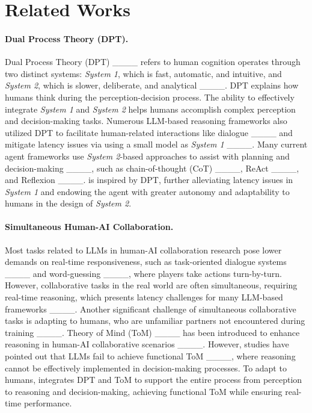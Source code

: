 \section{Related Works}
\paragraph{Dual Process Theory (DPT).}
Dual Process Theory (DPT) ____ refers to human cognition operates through two distinct systems: \textit{System 1}, which is fast, automatic, and intuitive, and \textit{System 2}, which is slower, deliberate, and analytical ____.
DPT explains how humans think during the perception-decision process. 
The ability to effectively integrate \textit{System 1} and \textit{System 2} helps humans accomplish complex perception and decision-making tasks.
Numerous LLM-based reasoning frameworks also utilized DPT to facilitate human-related interactions like dialogue ____ and mitigate latency issues via using a small model as \textit{System 1} ____.
Many current agent frameworks use \textit{System 2}-based approaches to assist with planning and decision-making ____, such as chain-of-thought (CoT) ____, ReAct ____, and Reflexion ____.
\framework is inspired by DPT, further alleviating latency issues in \textit{System 1} and endowing the agent with greater autonomy and adaptability to humans in the design of \textit{System 2}.


\paragraph{Simultaneous Human-AI Collaboration.}
Most tasks related to LLMs in human-AI collaboration research pose lower demands on real-time responsiveness, such as task-oriented dialogue systems ____ and word-guessing ____, where players take actions turn-by-turn.
However, collaborative tasks in the real world are often simultaneous, requiring real-time reasoning, which presents latency challenges for many LLM-based frameworks ____.
Another significant challenge of simultaneous collaborative tasks is adapting to humans, who are unfamiliar partners not encountered during training ____. 
Theory of Mind (ToM) ____ has been introduced to enhance reasoning in human-AI collaborative scenarios ____.
However, studies have pointed out that LLMs fail to achieve functional ToM ____, where reasoning cannot be effectively implemented in decision-making processes.
To adapt to humans, \framework integrates DPT and ToM to support the entire process from perception to reasoning and decision-making, achieving functional ToM while ensuring real-time performance.